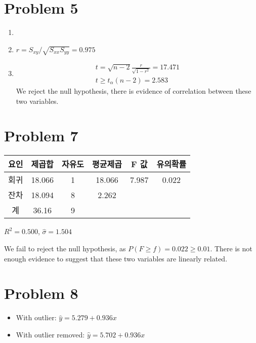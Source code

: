 \documentclass{article}
\begin{document}
\section*{Problem 5}

\begin{enumerate}
	\item ~ \\ 
	\item $r = S_{xy}/\sqrt{S_{xx} S_{yy}} = 0.975$
	\item
		\begin{gather*}
			t = \sqrt{n-2} \frac{r}{\sqrt{1-r^2}} = 17.471 \\
			t \ge t_{\alpha}(n-2) = 2.583
		\end{gather*}
		We reject the null hypothesis, there is evidence of correlation
		between these two variables.
\end{enumerate}

\section*{Problem 7}

\begin{center}
\begin{tabular}{c|ccccc}
	요인 & 제곱합 & 자유도 & 평균제곱 & F 값 & 유의확률 \\
	\hline
	회귀 & 18.066 & 1 & 18.066 & 7.987 & 0.022 \\
	잔차 & 18.094 & 8 & 2.262  & \\
	\hline
	계   & 36.16  & 9 \\
\end{tabular}
\end{center}

$R^2 = 0.500$, $\widehat{\sigma} = 1.504$

We fail to reject the null hypothesis, as $P(F \ge f) = 0.022 \ge 0.01$. There
is not enough evidence to suggest that these two variables are linearly
related.

\section*{Problem 8}

\begin{itemize}
	\item With outlier: $\widehat{y} = 5.279 + 0.936 x$
	\item With outlier removed: $\widehat{y} = 5.702 + 0.936 x$
\end{itemize}
\end{document}
